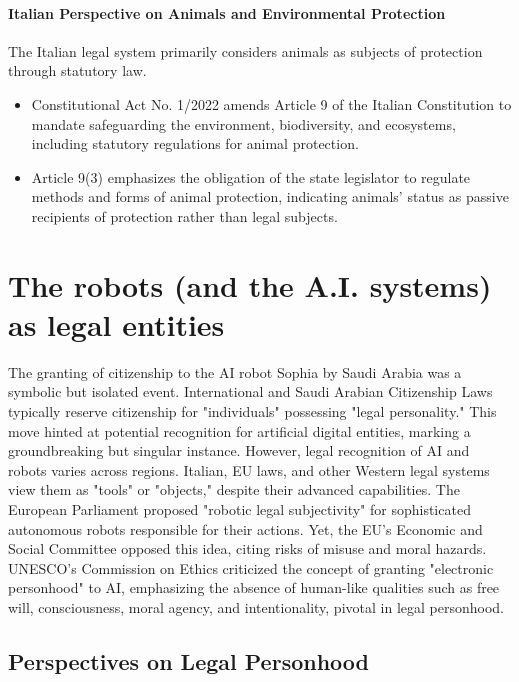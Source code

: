 \paragraph{Italian Perspective on Animals and Environmental Protection}
The Italian legal system primarily considers animals as subjects of protection through statutory law.

\begin{itemize}[label=-]
    \item Constitutional Act No. 1/2022 amends Article 9 of the Italian Constitution to mandate safeguarding the environment, biodiversity, and ecosystems, including statutory regulations for animal protection.
    \item Article 9(3) emphasizes the obligation of the state legislator to regulate methods and forms of animal protection, indicating animals' status as passive recipients of protection rather than legal subjects.
\end{itemize}

\section{The robots (and the A.I. systems) as legal entities}
The granting of citizenship to the AI robot Sophia by Saudi Arabia was a symbolic but isolated event. International and Saudi Arabian Citizenship Laws typically reserve citizenship for "individuals" possessing "legal personality." This move hinted at potential recognition for artificial digital entities, marking a groundbreaking but singular instance. \newline
However, legal recognition of AI and robots varies across regions. Italian, EU laws, and other Western legal systems view them as "tools" or "objects," despite their advanced capabilities.
\newline
The European Parliament proposed "robotic legal subjectivity" for sophisticated autonomous robots responsible for their actions. Yet, the EU's Economic and Social Committee opposed this idea, citing risks of misuse and moral hazards.
\newline
UNESCO's Commission on Ethics criticized the concept of granting "electronic personhood" to AI, emphasizing the absence of human-like qualities such as free will, consciousness, moral agency, and intentionality, pivotal in legal personhood.

\subsection{Perspectives on Legal Personhood}
